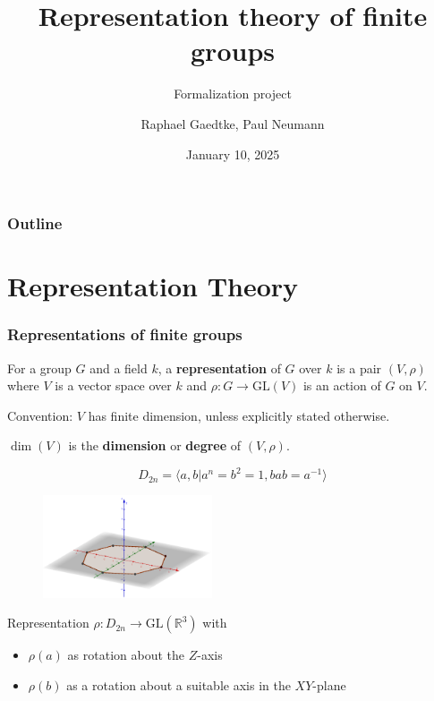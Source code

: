 \documentclass{beamer}
\title{Representation theory of finite groups}
\subtitle{Formalization project}
\author{Raphael Gaedtke, Paul Neumann}
\institute{University of Bonn}
\date{January 10, 2025}
\newcommand{\GL}{\text{GL}}
\newcommand{\inv}{^{-1}}
\newcommand{\R}{\mathbb{R}}
\begin{document}
\begin{frame}
\titlepage
\end{frame}


\begin{frame}
\frametitle{Outline}
\tableofcontents
\end{frame}

\section{Representation Theory}
\begin{frame}
\frametitle{Representations of finite groups}
\begin{definition}
For a group \(G\) and a field \(k\), a \textbf{representation} of \(G\) over \(k\) is a pair \((V, \rho)\) where \(V\) is a vector space over \(k\) and \(\rho: G\to \GL (V)\) is an action of \(G\) on \(V\).
\end{definition}
\pause
Convention: \(V\) has finite dimension, unless explicitly stated otherwise.
\begin{definition}
\(\dim (V)\) is the \textbf{dimension} or \textbf{degree} of \((V, \rho)\).
\end{definition}
\end{frame}


\begin{frame}
\begin{example}
\begin{equation*}
D_{2n} = \langle a, b \vert a^n = b^2 = 1, bab = a\inv \rangle
\end{equation*}
\begin{figure}[h]
\begin{center}
\includegraphics[width = 5cm]{images/octagon.png}
\end{center}
\end{figure}
\pause
Representation \(\rho: D_{2n} \to \GL (\R^3)\) with 
\begin{itemize}
\item \(\rho(a)\) as rotation about the \(Z\)-axis
\item \(\rho(b)\) as a rotation about a suitable axis in the \(XY\)-plane
\end{itemize}
\end{example}
\end{frame}
\end{document}
